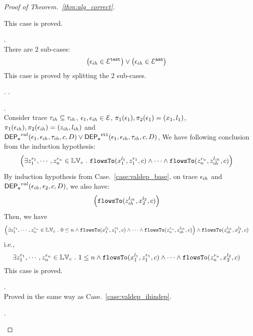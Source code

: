 \begin{proof}[Proof of Theorem.~\ref{thm:alg_correct}]
\begin{case}
\begin{subcase}
\[\]
This case is proved.
\end{subcase}
%
\begin{subcase}
\label{case:valdep_ihdep}.
\\
There are 2 sub-cases: 
%
 \[
 \big(\mathtt{\epsilon}_{ih} \in \mathcal{E}^{\mathtt{{test}}}\big) \lor \big(\mathtt{\epsilon}_{ih} \in \mathcal{E}^{\mathtt{{asn}}}\big)
 \]
%
This case is proved by splitting the 2 sub-cases.
\begin{subsubcase}.
\label{case:valdep_ihdepasn}.
\begin{subsubsubcase}.
\\
Consider trace $\mathtt{\tau}_{ih} \subseteq \mathtt{\tau}_{ih}$,  $\mathtt{\epsilon}_1, \mathtt{\epsilon}_{ih} \in \mathcal{E}$, 
$\pi_1(\mathtt{\epsilon}_1), \pi_2(\mathtt{\epsilon}_1) = (x_1, l_1)$, $\pi_1(\mathtt{\epsilon}_{ih}), \pi_2(\mathtt{\epsilon}_{ih}) = (z_{ih}, l_{ih})$ and
$\mathsf{DEP_{\mathtt{e}}}^{val}(\mathtt{\epsilon}_1, \mathtt{\epsilon}_{ih}, \mathtt{\tau}_{ih}, c, D) \lor \mathsf{DEP_{\mathtt{e}}}^{\mathtt{{ctl}}}(\mathtt{\epsilon}_1, \mathtt{\epsilon}_{ih}, \mathtt{\tau}_{ih}, c, D) $, 
We have following conclusion from the induction hypothesis:
%
\[
\Big(\exists z_1^{r_1}, \cdots, z_n^{r_n} \in \mathbb{LV}_{{c}} ~.~ \mathtt{flowsTo}(x_1^{l_1}, z_1^{r_1}, c) \land \cdots \land \mathtt{flowsTo}(z_n^{r_n}, z_{ih}^{l_{ih}}, c) \Big)
\]
%
By induction hypothesis from Case.~\ref{case:valdep_base}, on trace $\mathtt{\epsilon}_{ih}$ and $\mathsf{DEP_{\mathtt{e}}}^{val}(\mathtt{\epsilon}_{ih}, \mathtt{\epsilon}_2, c, D)$,
we also have:
\[
\Big( \mathtt{flowsTo}(z_{ih}^{l_{ih}}, {x}_2^{l_2}, c) \Big)
\]
%
Then, we have
%
\[
\Big(\exists z_1^{r_1}, \cdots, z_n^{r_n} \in \mathbb{LV}_{{c}} ~.~  0 \leq n \land
 \mathtt{flowsTo}(x_1^{l_1}, z_1^{r_1}, c) \land \cdots \land \mathtt{flowsTo}(z_n^{r_n}, z_{ih}^{l_{ih}}, c)
  \Big)\land \mathtt{flowsTo}(z_{ih}^{l_{ih}}, {x}_2^{l_2}, c)
\]
%
i.e.,
\[
\exists z_1^{r_1}, \cdots, z_n^{r_n} \in \mathbb{LV}_{{c}} ~.~ 1 \leq n \land \mathtt{flowsTo}(x_1^{l_1}, z_1^{r_1}, c) \land \cdots 
\land \mathtt{flowsTo}(z_n^{r_n}, {x}_2^{l_2}, c)
\]
%
This case is proved.
\end{subsubsubcase}
\begin{subsubsubcase}.
\\
Proved in the same way as Case.~\ref{case:valdep_ihindep}.
\end{subsubsubcase}
\end{subsubcase}
\begin{subsubcase}.

\end{subsubcase}
\end{subcase}
\end{case}
\end{proof}
